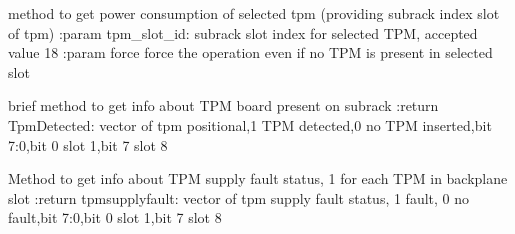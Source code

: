 \documentclass[letterpaper,10pt,english]{sphinxmanual}
\begin{document}
\begin{fulllineitems}
\begin{fulllineitems}
\end{fulllineitems}


\begin{fulllineitems}
\label{\detokenize{apidocs:subrack_management_board.SubrackMngBoard.GetTPMPower}}
\pysigstartsignatures
{}
\pysigstopsignatures
\sphinxAtStartPar
method to get power consumption of selected tpm (providing subrack index slot of tpm)
:param tpm\_slot\_id: subrack slot index for selected TPM, accepted value 1\sphinxhyphen{}8
:param force force the operation even if no TPM is present in selected slot

\end{fulllineitems}


\begin{fulllineitems}
\label{\detokenize{apidocs:subrack_management_board.SubrackMngBoard.GetTPMPresent}}
\pysigstartsignatures
{}
\pysigstopsignatures
\sphinxAtStartPar
brief method to get info about TPM board present on subrack
:return TpmDetected: vector of tpm positional,1 TPM detected,0 no TPM inserted,bit 7:0,bit 0 slot 1,bit 7 slot 8

\end{fulllineitems}


\begin{fulllineitems}
\label{\detokenize{apidocs:subrack_management_board.SubrackMngBoard.GetTPMSupplyFault}}
\pysigstartsignatures
{}
\pysigstopsignatures
\sphinxAtStartPar
Method to get info about TPM supply fault status, 1 for each TPM in backplane slot
:return tpmsupplyfault: vector of tpm supply fault status, 1 fault, 0 no fault,bit 7:0,bit 0 slot 1,bit 7 slot 8


\end{fulllineitems}
\end{fulllineitems}
\end{document}
